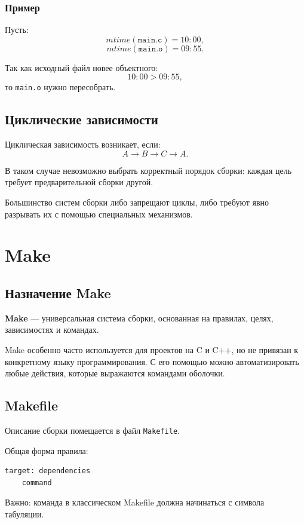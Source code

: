\documentclass[12pt,a4paper]{article}
\begin{document}
\subsubsection{Пример}

Пусть:
\[
mtime(\texttt{main.c}) = 10:00,
\]
\[
mtime(\texttt{main.o}) = 09:55.
\]

Так как исходный файл новее объектного:
\[
10:00 > 09:55,
\]
то \texttt{main.o} нужно пересобрать.

\subsection{Циклические зависимости}

Циклическая зависимость возникает, если:
\[
A \rightarrow B \rightarrow C \rightarrow A.
\]

В таком случае невозможно выбрать корректный порядок сборки: каждая цель требует предварительной сборки другой.

Большинство систем сборки либо запрещают циклы, либо требуют явно разрывать их с помощью специальных механизмов.

\section{Make}

\subsection{Назначение Make}

\textbf{Make} --- универсальная система сборки, основанная на правилах, целях, зависимостях и командах.

Make особенно часто используется для проектов на C и C++, но не привязан к конкретному языку программирования. С его помощью можно автоматизировать любые действия, которые выражаются командами оболочки.

\subsection{Makefile}

Описание сборки помещается в файл \texttt{Makefile}.

Общая форма правила:

\begin{lstlisting}
target: dependencies
	command
\end{lstlisting}

Важно: команда в классическом Makefile должна начинаться с символа табуляции.
\end{document}
